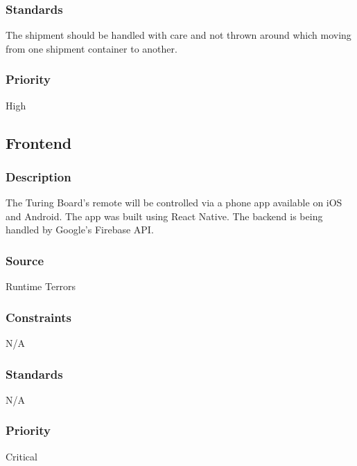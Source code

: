 \subsubsection{Standards}
The shipment should be handled with care and not thrown around which moving from one shipment container to another.
\subsubsection{Priority}
High

\subsection{Frontend}
\subsubsection{Description}
The Turing Board's remote will be controlled via a phone app available on iOS and Android. The app was built using React Native. The backend is being handled by Google's Firebase API.
\subsubsection{Source}
Runtime Terrors
\subsubsection{Constraints}
N/A
\subsubsection{Standards}
N/A
\subsubsection{Priority}
Critical
